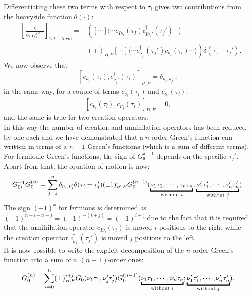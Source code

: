 \documentclass[12pt, a4paper]{report}
\numberwithin{equation}{section}
\begin{document}
Differentiating these two terms with respect to $\tau_i$ gives two contributions from the heavyside function $\theta(\cdot)$:
\begin{equation}
\begin{split}
    -\left[\frac{\partial}{\partial\tau_iG_0^{(n)}}\right]_{1st-term}=&\left([\cdots]\langle \cdots c_{I\nu_i}(\tau_I)c^\dagger_{I\nu_j'}(\tau_j')\cdots\rangle \right.\\
    &\left. (\mp)_{B,F}[\cdots]\langle \cdots c^\dagger_{\nu_j'}(\tau_j')c_{\nu_i}(\tau_i)\cdots\rangle \right)\delta(\tau_i-\tau_j').
\end{split}
\end{equation}
We now observe that
\begin{equation}
    \left[c_{\nu_i}(\tau_i),c^\dagger_{\nu_j'}(\tau_i)\right]_{B,F}=\delta_{\nu_i,\nu_j'},
\end{equation}
in the same way, for a couple of terms $c_{\nu_i}(\tau_i)$ and $c_{\nu_j}(\tau_i)$:
\begin{equation}
    \left[c_{\nu_i}(\tau_i),c_{\nu_j}(\tau_i)\right]_{B,F}=0,
\end{equation}
and the same is true for two creation operators.\\
In this way the number of creation and annihilation operators has been reduced by one each and we have demonstrated that a $n$ order Green's function 
can written in terms of a $n-1$ Green's functions (which is a sum of different terms). For fermionic Green's functions, the sign of $G_0^{n-1}$ 
depends on the specific $\tau_j'$. Apart from that, the equation of motion is now:
\begin{equation}
    G^{-1}_{0i}G^{(n)}_0=\sum_{j=1}^n\delta_{\nu_i,\nu_j'}\delta(\tau_i-\tau_j')(\pm1)^x_{B,F}G_0^{(n-1)}(\underbracket[1.5pt][3pt]{\nu_1\tau_1,\cdots,\nu_n\tau_n}_{\mathclap{\text{without $i$}}};\underbracket[1.5pt][3pt]{\nu_1'\tau_1',\cdots,\nu_n'\tau_n'}_{\mathclap{\text{without $j$}}}).
\end{equation}
The sign $(-1)^x$ for fermions is determined as $(-1)^{n-i+n-j}=(-1)^{-(i+j)}=(-1)^{i+j}$ due to the fact that it is required that the annihilation operator $c_{I\nu_i}(\tau_i)$ 
is moved $i$ positions to the right while the creation operator $c^\dagger_{\nu_j'}(\tau_j')$ is moved $j$ positions to the left.\\
It is now possible to write the explicit decomposition of the $n$-order Green's function into a sum of $n$ $(n-1)$-order ones:
\begin{equation}
    G_0^{(n)}=\sum_{i=0}^{n}(\pm)^{i+j}_{B,F}G_0(\nu_1\tau_1,\nu_j'\tau_j')G_0^{(n-1)}(\underbracket[1.5pt][3pt]{\nu_1\tau_1,\cdots,\nu_n\tau_n}_{\mathclap{\text{without $i$}}};\underbracket[1.5pt][3pt]{\nu_1'\tau_1',\cdots,\nu_n'\tau_n'}_{\mathclap{\text{without $j$}}}).
\end{equation}
\end{document}
